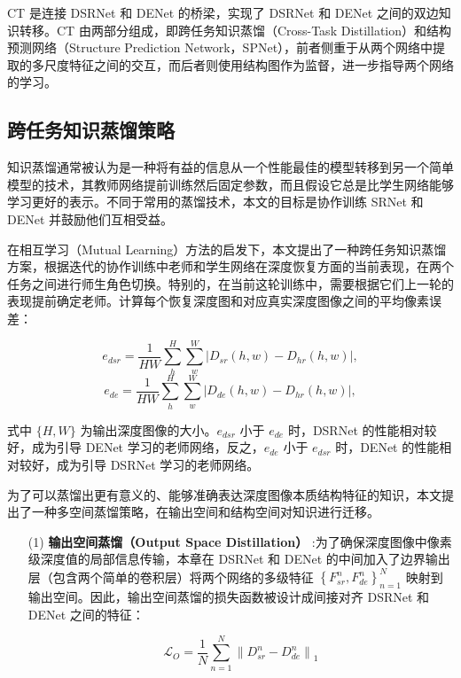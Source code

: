 \documentclass{vip-theme}
\begin{document}
\begin{sloppypar}
CT 是连接 DSRNet 和 DENet 的桥梁，实现了 DSRNet 和 DENet 之间的双边知识转移。CT 由两部分组成，即跨任务知识蒸馏（Cross-Task Distillation）和结构预测网络（Structure Prediction Network，SPNet），前者侧重于从两个网络中提取的多尺度特征之间的交互，而后者则使用结构图作为监督，进一步指导两个网络的学习。

\subsection{跨任务知识蒸馏策略}

知识蒸馏通常被认为是一种将有益的信息从一个性能最佳的模型转移到另一个简单模型的技术，其教师网络提前训练然后固定参数，而且假设它总是比学生网络能够学习更好的表示。不同于常用的蒸馏技术，本文的目标是协作训练 SRNet 和 DENet 并鼓励他们互相受益。

在相互学习（Mutual Learning）方法的启发下，本文提出了一种跨任务知识蒸馏方案，根据迭代的协作训练中老师和学生网络在深度恢复方面的当前表现，在两个任务之间进行师生角色切换。特别的，在当前这轮训练中，需要根据它们上一轮的表现提前确定老师。计算每个恢复深度图和对应真实深度图像之间的平均像素误差：

\begin{equation}\label{esr}
e_{dsr} = \frac{1}{HW}\sum_h^H\sum_w^W|D_{sr}(h,w) -D_{hr}(h,w)|,
\end{equation}
\begin{equation}\label{ede}
e_{de} = \frac{1}{HW}\sum_h^H\sum_w^W|D_{de}(h,w) -D_{hr}(h,w)|,
\end{equation}

式中 $\{H,W\}$ 为输出深度图像的大小。$e_{dsr}$ 小于 $e_{de}$ 时，DSRNet 的性能相对较好，成为引导 DENet 学习的老师网络，反之，$e_{de}$ 小于 $e_{dsr}$ 时，DENet 的性能相对较好，成为引导 DSRNet 学习的老师网络。

为了可以蒸馏出更有意义的、能够准确表达深度图像本质结构特征的知识，本文提出了一种多空间蒸馏策略，在输出空间和结构空间对知识进行迁移。

\begin{enumerate}
	\item[(1)] \textbf{输出空间蒸馏（Output Space Distillation）} :为了确保深度图像中像素级深度值的局部信息传输，本章在 DSRNet 和 DENet 的中间加入了边界输出层（包含两个简单的卷积层）将两个网络的多级特征 $\left\{F_{s r}^{n}, F_{d e}^{n}\right\}_{n=1}^{N}$ 映射到输出空间。因此，输出空间蒸馏的损失函数被设计成间接对齐 DSRNet 和 DENet 之间的特征：
	
	\begin{equation}
\mathcal{L}_{O}=\frac{1}{N} \sum_{n=1}^{N}\left\|D_{s r}^{n}-D_{d e}^{n}\right\|_{1}
\end{equation}


\end{enumerate}
\end{sloppypar}
\end{document}
